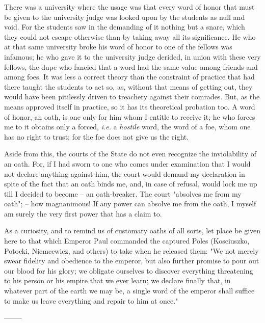 \documentclass[a4paper]{book}
\begin{document}
There was a university where the usage was that every word of honor that must 
be given to the university judge was looked upon by the students as null and 
void. For the students saw in the demanding of it nothing but a snare, which 
they could not escape otherwise than by taking away all its significance. He 
who at that same university broke his word of honor to one of the fellows was 
infamous; he who gave it to the university judge derided, in union with these 
very fellows, the dupe who fancied that a word had the same value among 
friends and among foes. It was less a correct theory than the constraint of 
practice that had there taught the students to act so, as, without that means 
of getting out, they would have been pitilessly driven to treachery against 
their comrades. But, as the means approved itself in practice, so it has its 
theoretical probation too. A word of honor, an oath, is one only for him whom 
I entitle to receive it; he who forces me to it obtains only a forced, 
\textit{i.e.} a \textit{hostile} word, the word of a foe, whom one has no 
right to trust; for the foe does not give us the right.

Aside from this, the courts of the State do not even recognize the 
inviolability of an oath. For, if I had sworn to one who comes under 
examination that I would not declare anything against him, the court would 
demand my declaration in spite of the fact that an oath binds me, and, in case 
of refusal, would lock me up till I decided to become -- an oath-breaker. The 
court "{}absolves me from my oath"{}; -- how magnanimous! If any power can 
absolve me from the oath, I myself am surely the very first power that has a 
claim to.

As a curiosity, and to remind us of customary oaths of all sorts, let place be 
given here to that which Emperor Paul commanded the captured Poles 
(Kosciuszko, Potocki, Niemcewicz, and others) to take when he released them: 
"{}We not merely swear fidelity and obedience to the emperor, but also further 
promise to pour out our blood for his glory; we obligate ourselves to discover 
everything threatening to his person or his empire that we ever learn; we 
declare finally that, in whatever part of the earth we may be, a single word 
of the emperor shall suffice to make us leave everything and repair to him at 
once."{}

\begin{center}
--------\end{center}
\end{document}
